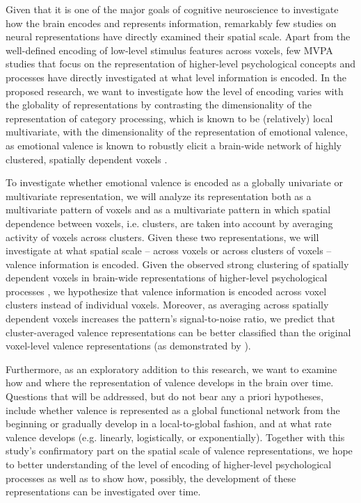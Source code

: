 \documentclass[12pt,a4paper]{article}\usepackage[]{graphicx}\usepackage[]{color}
\begin{document}
Given that it is one of the major goals of cognitive neuroscience to investigate how the brain encodes and represents information, remarkably few studies on neural representations have directly examined their spatial scale. Apart from the well-defined encoding of low-level stimulus features across voxels, few MVPA studies that focus on the representation of higher-level psychological concepts and processes have directly investigated at what level information is encoded. In the proposed research, we want to investigate how the level of encoding varies with the globality of representations by contrasting the dimensionality of the representation of category processing, which is known to be (relatively) local multivariate, with the dimensionality of the representation of emotional valence, as emotional valence is known to robustly elicit a brain-wide network of highly clustered, spatially dependent voxels \citep{lindquist2015,chavez2015,kassam2013,oosterwijk2015}.     

To investigate whether emotional valence is encoded as a globally univariate or multivariate representation, we will analyze its representation both as a multivariate pattern of voxels and as a multivariate pattern in which spatial dependence between voxels, i.e. clusters, are taken into account by averaging activity of voxels across clusters. Given these two representations, we will investigate at what spatial scale -- across voxels or across clusters of voxels -- valence information is encoded.  Given the observed strong clustering of spatially dependent voxels in brain-wide representations of higher-level psychological processes \cite{kassam2013,oosterwijk2015,baucom2012}, we hypothesize that valence information is encoded across voxel clusters instead of individual voxels. Moreover, as averaging across spatially dependent voxels increases the pattern's signal-to-noise ratio, we predict that cluster-averaged valence representations can be better classified than the original voxel-level valence representations (as demonstrated by \citealp{brants2011}).  

Furthermore, as an exploratory addition to this research, we want to examine how and where the representation of valence develops in the brain over time. Questions that will be addressed, but do not bear any a priori hypotheses, include whether valence is represented as a global functional network from the beginning or gradually develop in a local-to-global fashion, and at what rate valence develops (e.g. linearly, logistically, or exponentially). Together with this study's confirmatory part on the spatial scale of valence representations, we hope to better understanding of the level of encoding of higher-level psychological processes as well as to show how, possibly, the development of these representations can be investigated over time.
\end{document}
